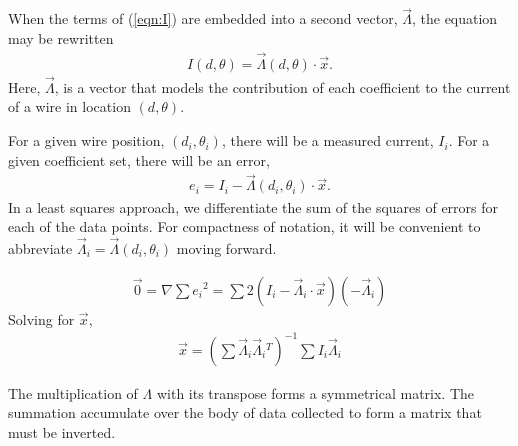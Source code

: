 \documentclass{article}
\begin{document}
When the terms of (\ref{eqn:I}) are embedded into a second vector, $\vec{\Lambda}$, the equation may be rewritten
\begin{align}
I(d,\theta) = \vec{\Lambda}(d,\theta) \cdot \vec{x}.
\end{align}
Here, $\vec{\Lambda}$, is a vector that models the contribution of each coefficient to the current of a wire in location $(d,\theta)$.

For a given wire position, $(d_i, \theta_i)$, there will be a measured current, $I_i$.  For a given coefficient set, there will be an error,
\begin{align}
e_i = I_i - \vec{\Lambda}(d_i, \theta_i) \cdot \vec{x}.
\end{align}
In a least squares approach, we differentiate the sum of the squares of errors for each of the data points.  For compactness of notation, it will be convenient to abbreviate $\vec{\Lambda}_i = \vec{\Lambda}(d_i, \theta_i)$ moving forward.

\begin{align}
\vec{0} = \nabla \sum e_i {^2} = \sum 2(I_i - \vec{\Lambda}_i \cdot \vec{x})(- \vec{\Lambda}_i)
\end{align}
Solving for $\vec{x}$,
\begin{align}
\vec{x} = \left(\sum \vec{\Lambda}_i \vec{\Lambda}_i{^T}\right)^{-1} \sum I_i \vec{\Lambda}_i
\end{align}

The multiplication of $\Lambda$ with its transpose forms a symmetrical matrix.  The summation accumulate over the body of data collected to form a matrix that must be inverted.
\end{document}
